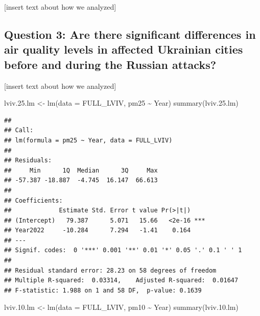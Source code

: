 \documentclass[
  12pt,
]{article}
\newenvironment{Shaded}{\begin{snugshade}}{\end{snugshade}}
\newcommand{\AttributeTok}[1]{\textcolor[rgb]{0.77,0.63,0.00}{#1}}
\newcommand{\FloatTok}[1]{\textcolor[rgb]{0.00,0.00,0.81}{#1}}
\newcommand{\FunctionTok}[1]{\textcolor[rgb]{0.00,0.00,0.00}{#1}}
\newcommand{\NormalTok}[1]{#1}
\newcommand{\OtherTok}[1]{\textcolor[rgb]{0.56,0.35,0.01}{#1}}
\newcommand{\SpecialCharTok}[1]{\textcolor[rgb]{0.00,0.00,0.00}{#1}}
\begin{document}
{[}insert text about how we analyzed{]}

\hypertarget{question-3-are-there-significant-differences-in-air-quality-levels-in-affected-ukrainian-cities-before-and-during-the-russian-attacks}{%
\subsection{Question 3: Are there significant differences in air quality
levels in affected Ukrainian cities before and during the Russian
attacks?}\label{question-3-are-there-significant-differences-in-air-quality-levels-in-affected-ukrainian-cities-before-and-during-the-russian-attacks}}

{[}insert text about how we analyzed{]}

\begin{Shaded}
\begin{Highlighting}[]
\NormalTok{lviv.}\FloatTok{25.}\NormalTok{lm }\OtherTok{\textless{}{-}} \FunctionTok{lm}\NormalTok{(}\AttributeTok{data =}\NormalTok{ FULL\_LVIV, pm25 }\SpecialCharTok{\textasciitilde{}}\NormalTok{ Year) }
\FunctionTok{summary}\NormalTok{(lviv.}\FloatTok{25.}\NormalTok{lm) }
\end{Highlighting}
\end{Shaded}

\begin{verbatim}
## 
## Call:
## lm(formula = pm25 ~ Year, data = FULL_LVIV)
## 
## Residuals:
##     Min      1Q  Median      3Q     Max 
## -57.387 -18.887  -4.745  16.147  66.613 
## 
## Coefficients:
##             Estimate Std. Error t value Pr(>|t|)    
## (Intercept)   79.387      5.071   15.66   <2e-16 ***
## Year2022     -10.284      7.294   -1.41    0.164    
## ---
## Signif. codes:  0 '***' 0.001 '**' 0.01 '*' 0.05 '.' 0.1 ' ' 1
## 
## Residual standard error: 28.23 on 58 degrees of freedom
## Multiple R-squared:  0.03314,    Adjusted R-squared:  0.01647 
## F-statistic: 1.988 on 1 and 58 DF,  p-value: 0.1639
\end{verbatim}

\begin{Shaded}
\begin{Highlighting}[]
\NormalTok{lviv.}\FloatTok{10.}\NormalTok{lm }\OtherTok{\textless{}{-}} \FunctionTok{lm}\NormalTok{(}\AttributeTok{data =}\NormalTok{ FULL\_LVIV, pm10 }\SpecialCharTok{\textasciitilde{}}\NormalTok{ Year) }
\FunctionTok{summary}\NormalTok{(lviv.}\FloatTok{10.}\NormalTok{lm) }
\end{Highlighting}
\end{Shaded}
\end{document}
